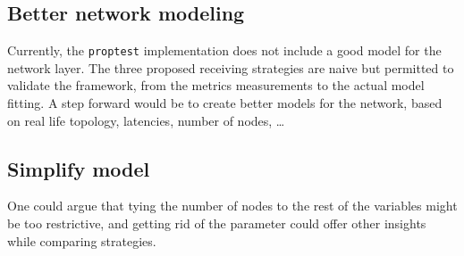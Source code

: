 \subsection{Better network modeling}
Currently, the \texttt{proptest} implementation does not include a good model
for the network layer. The three proposed receiving strategies are naive but
permitted to validate the framework, from the metrics measurements to the actual
model fitting. A step forward would be to create better models for the
network, based on real life topology, latencies, number of nodes, \ldots

\subsection{Simplify model}
One could argue that tying the number of nodes to the rest of the variables
might be too restrictive, and getting rid of the parameter could offer other
insights while comparing strategies.
